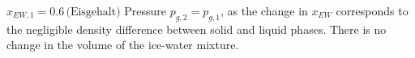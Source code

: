 \( x_{EW,1} = 0.6 \, \text{(Eisgehalt)} \)  
Pressure \( p_{g,2} = p_{g,1} \), as the change in \( x_{EW} \) corresponds to the negligible density difference between solid and liquid phases. There is no change in the volume of the ice-water mixture.